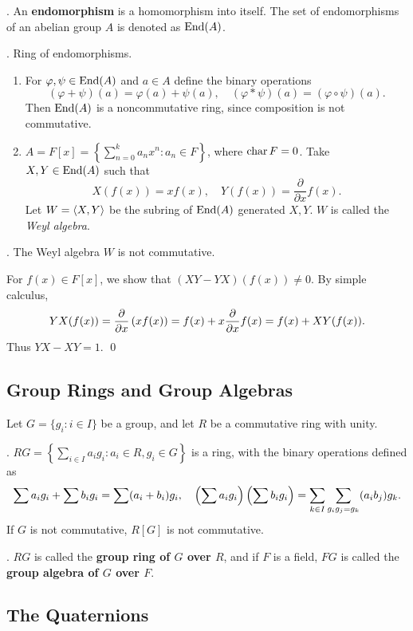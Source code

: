 \setcounter{topic}{23}

.  An \textbf{endomorphism} is a homomorphism into itself. The set of endomorphisms of an abelian group \(A\) is denoted as \(\mathrm{End}(A)\).

\ex. Ring of endomorphisms.
\begin{enumerate}
    \item For \(\varphi, \psi \in \mathrm{End}(A)\) and \(a \in A\) define the binary operations
    \[
        (\varphi + \psi)(a) = \varphi(a) + \psi(a), \quad (\varphi * \psi)(a) = (\varphi \circ \psi)(a).
    \]
    Then \(\mathrm{End}(A)\) is a noncommutative ring, since composition is not commutative.
    \item \(A = F[x] = \left\{\sum_{n = 0}^k a_n x^n : a_n \in F\right\}\), where \(\operatorname{char} F = 0\). Take \(X, Y \in \mathrm{End}(A)\) such that
    \[
        X(f(x)) = xf(x), \quad Y(f(x)) = \frac{\partial}{\partial x}f(x).
    \]
    Let \(W = \left\langle X, Y \right\rangle\) be the subring of \(\mathrm{End}(A)\) generated \(X, Y\). \(W\) is called the \textit{Weyl algebra}.
\end{enumerate}

\prop. The Weyl algebra \(W\) is not commutative.

\pf For \(f(x) \in F[x]\), we show that \((XY - YX)(f(x)) \neq 0\). By simple calculus,
\[
    YX(f(x)) = \frac{\partial}{\partial x}\left( x f(x) \right) = f(x) + x \frac{\partial}{\partial x}f(x) = f(x) + XY(f(x)).
\]
Thus \(YX - XY = 1\). \qed

\subsection*{Group Rings and Group Algebras}

Let \(G = \{g_i : i \in I\}\) be a group, and let \(R\) be a commutative ring with unity.

\prop. \(RG = \left\{\sum_{i \in I} a_ig_i : a_i \in R, g_i \in G\right\}\) is a ring, with the binary operations defined as
\[
    \sum a_i g_i + \sum b_i g_i = \sum (a_i + b_i) g_i, \quad \left( \sum a_i g_i \right) \left( \sum b_i g_i \right) = \sum_{k \in I} \sum_{g_i g_j = g_k} (a_i b_j) g_k.
\]
If \(G\) is not commutative, \(R[G]\) is not commutative.

. \(RG\) is called the \textbf{group ring of \(G\) over \(R\)}, and if \(F\) is a field, \(FG\) is called the \textbf{group algebra of \(G\) over \(F\)}.

\subsection*{The Quaternions}

